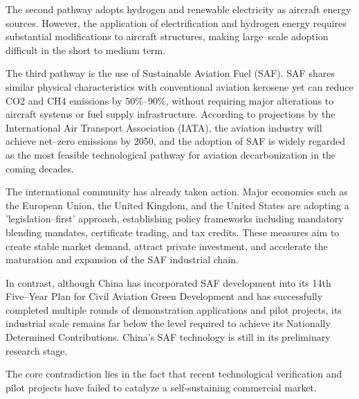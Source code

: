 \documentclass[a4paper,11pt]{article}
\begin{document}
The second pathway adopts hydrogen and renewable electricity as aircraft energy sources. However, the application of electrification and hydrogen energy requires substantial modifications to aircraft structures, making large--scale adoption difficult in the short to medium term.

The third pathway is the use of Sustainable Aviation Fuel (SAF). SAF shares similar physical characteristics with conventional aviation kerosene yet can reduce CO2 and CH4 emissions by 50\%--90\%, without requiring major alterations to aircraft systems or fuel supply infrastructure. According to projections by the International Air Transport Association (IATA), the aviation industry will achieve net--zero emissions by 2050, and the adoption of SAF is widely regarded as the most feasible technological pathway for aviation decarbonization in the coming decades.

The international community has already taken action. Major economies such as the European Union, the United Kingdom, and the United States are adopting a 'legislation--first' approach, establishing policy frameworks including mandatory blending mandates, certificate trading, and tax credits. These measures aim to create stable market demand, attract private investment, and accelerate the maturation and expansion of the SAF industrial chain.

In contrast, although China has incorporated SAF development into its 14th Five--Year Plan for Civil Aviation Green Development \cite{caac2021} and has successfully completed multiple rounds of demonstration applications and pilot projects, its industrial scale remains far below the level required to achieve its Nationally Determined Contributions. China's SAF technology is still in its preliminary research stage.

The core contradiction lies in the fact that recent technological verification and pilot projects have failed to catalyze a self-sustaining commercial market.
\end{document}
